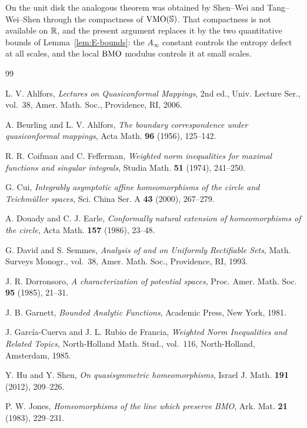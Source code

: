\begin{remark}
	On the unit disk the analogous theorem was obtained by Shen--Wei \cite{SW} and
	Tang--Wei--Shen \cite{TWS} through the compactness of $\mathrm{VMO}(\mathbb{S})$. That
	compactness is not available on $\mathbb{R}$, and the present argument replaces it by
	the two quantitative bounds of Lemma~\ref{lem:E-bounds}: the $A_\infty$
	constant controls the entropy defect at all scales, and the local $\mathrm{BMO}$
	modulus controls it at small scales.
\end{remark}
\begin{thebibliography}{99}

 L. V. Ahlfors, \textit{Lectures on Quasiconformal Mappings}, 2nd ed., Univ. Lecture Ser., vol.~38, Amer. Math. Soc., Providence, RI, 2006.

 A. Beurling and L. V. Ahlfors, \textit{The boundary correspondence under quasiconformal mappings}, Acta Math. \textbf{96} (1956), 125--142.

 R. R. Coifman and C. Fefferman, \textit{Weighted norm inequalities for maximal functions and singular integrals}, Studia Math. \textbf{51} (1974), 241--250.

 G. Cui, \textit{Integrably asymptotic affine homeomorphisms of the circle and Teichm\"uller spaces}, Sci. China Ser. A \textbf{43} (2000), 267--279.

 A. Douady and C. J. Earle, \textit{Conformally natural extension of homeomorphisms of the circle}, Acta Math. \textbf{157} (1986), 23--48.

 G. David and S. Semmes, \textit{Analysis of and on Uniformly Rectifiable Sets}, Math. Surveys Monogr., vol.~38, Amer. Math. Soc., Providence, RI, 1993.

 J. R. Dorronsoro, \textit{A characterization of potential spaces}, Proc. Amer. Math. Soc. \textbf{95} (1985), 21--31.

 J. B. Garnett, \textit{Bounded Analytic Functions}, Academic Press, New York, 1981.

 J. Garc\'ia-Cuerva and J. L. Rubio de Francia, \textit{Weighted Norm Inequalities and Related Topics}, North-Holland Math. Stud., vol.~116, North-Holland, Amsterdam, 1985.

 Y. Hu and Y. Shen, \textit{On quasisymmetric homeomorphisms}, Israel J. Math. \textbf{191} (2012), 209--226.

 P. W. Jones, \textit{Homeomorphisms of the line which preserve BMO}, Ark. Mat. \textbf{21} (1983), 229--231.


\end{thebibliography}
